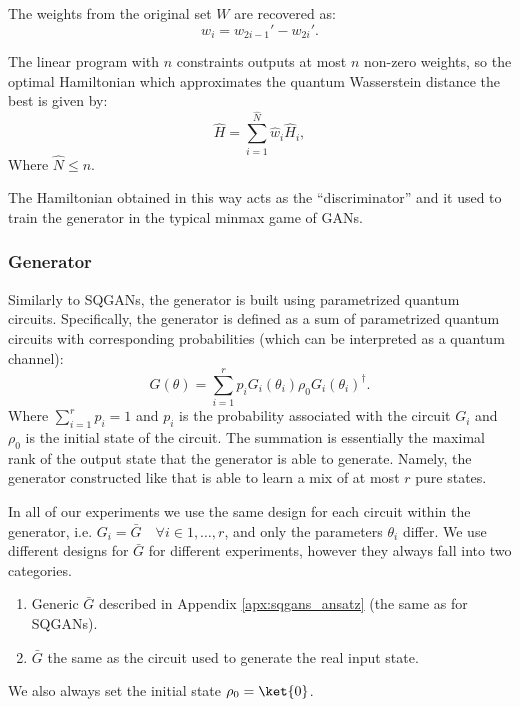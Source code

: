 The weights from the original set $W$ are recovered as:
\begin{equation}
  w_i = w_{2i-1}' - w_{2i}'.
\end{equation}


The linear program with $n$ constraints outputs at most $n$ non-zero
weights\cite{10.5555/548834}, so the optimal Hamiltonian which approximates the
quantum Wasserstein distance the best is given by:
\begin{equation}
\hat{H} = \sum_{i=1}^{\hat{N}}\hat{w}_i\hat{H}_i,
\end{equation}
Where $\hat{N} \leq n$.

The Hamiltonian obtained in this way acts as the ``discriminator'' and it used
to train the generator in the typical minmax game of GANs.

\subsubsection{Generator}
Similarly to SQGANs, the generator is built using parametrized quantum circuits.
Specifically, the generator is defined as a sum of parametrized quantum circuits
with corresponding probabilities (which can be interpreted as a quantum channel):
\begin{equation}
G(\theta) = \sum_{i=1}^r p_iG_i(\theta_i)\rho_0G_i(\theta_i)^\dagger.
\end{equation}
Where $\sum_{i=1}^r p_i = 1$ and $p_i$ is the probability associated with the
circuit $G_i$ and $\rho_0$ is the initial state of the circuit. The summation is
essentially the maximal rank of the output state that the generator is able to
generate. Namely, the generator constructed like that is able to learn a mix of
at most $r$ pure states.

In all of our experiments we use the same design for each circuit within the
generator, i.e. $G_i = \bar{G} \quad \forall i \in 1,\ldots, r$, and only the
parameters $\theta_i$ differ. We use different designs for $\bar{G}$ for
different experiments, however they always fall into two categories.
\begin{enumerate}
\item Generic $\bar{G}$ described in Appendix \ref{apx:sqgans_ansatz} (the same as for SQGANs).
\item $\bar{G}$ the same as the circuit used to generate the real input state.
\end{enumerate}
We also always set the initial state $\rho_0 = \ket{0}$.

